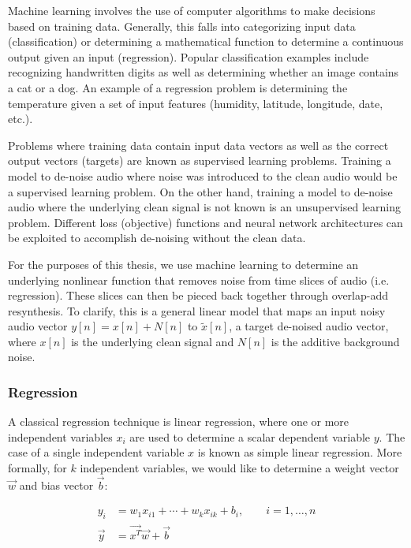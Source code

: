 Machine learning involves the use of computer algorithms to make decisions based on training data. Generally, this falls into categorizing input data (classification) or determining a mathematical function to determine a continuous output given an input (regression). Popular classification examples include recognizing handwritten digits as well as determining whether an image contains a cat or a dog. An example of a regression problem is determining the temperature given a set of input features (humidity, latitude, longitude, date, etc.).

Problems where training data contain input data vectors as well as the correct output vectors (targets) are known as supervised learning problems. Training a model to de-noise audio where noise was introduced to the clean audio would be a supervised learning problem. On the other hand, training a model to de-noise audio where the underlying clean signal is not known is an unsupervised learning problem. Different loss (objective) functions and neural network architectures can be exploited to accomplish de-noising without the clean data.

For the purposes of this thesis, we use machine learning to determine an underlying nonlinear function that removes noise from time slices of audio (i.e. regression). These slices can then be pieced back together through overlap-add resynthesis. To clarify, this is a general linear model that maps an input noisy audio vector $y[n]=x[n]+N[n]$ to $\tilde{x}[n]$, a target de-noised audio vector, where $x[n]$ is the underlying clean signal and $N[n]$ is the additive background noise.

\subsubsection{Regression}
A classical regression technique is linear regression, where one or more independent variables $x_{i}$ are used to determine a scalar dependent variable $y$. The case of a single independent variable $x$ is known as simple linear regression. More formally, for $k$ independent variables, we would like to determine a weight vector $\vec{w}$ and bias vector $\vec{b}$:

\begin{align}
y_i &= w_{1}x_{i1} + \cdots + w_{k}x_{ik} + b_{i}, \qquad i=1,\ldots ,n \\
\vec{y} &= \vec{x^T}\vec{w} + \vec{b}
\end{align}

